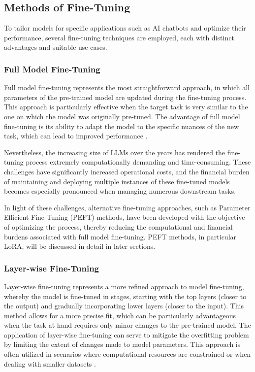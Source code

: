 \subsection{Methods of Fine-Tuning}

To tailor models for specific applications such as AI chatbots and optimize their performance, several fine-tuning techniques are employed, each with distinct advantages and suitable use cases.

\subsubsection{Full Model Fine-Tuning}

Full model fine-tuning represents the most straightforward approach, in which all parameters of the pre-trained model are updated during the fine-tuning process. This approach is particularly effective when the target task is very similar to the one on which the model was originally pre-tuned. The advantage of full model fine-tuning is its ability to adapt the model to the specific nuances of the new task, which can lead to improved performance \cite{howard2018universal}.

Nevertheless, the increasing size of LLMs over the years has rendered the fine-tuning process extremely computationally demanding and time-consuming. These challenges have significantly increased operational costs, and the financial burden of maintaining and deploying multiple instances of these fine-tuned models becomes especially pronounced when managing numerous downstream tasks.

In light of these challenges, alternative fine-tuning approaches, such as Parameter Efficient Fine-Tuning (PEFT) methods, have been developed with the objective of optimizing the process, thereby reducing the computational and financial burdens associated with full model fine-tuning. PEFT methods, in particular LoRA, will be discussed in detail in later sections.

\subsubsection{Layer-wise Fine-Tuning}

Layer-wise fine-tuning represents a more refined approach to model fine-tuning, whereby the model is fine-tuned in stages, starting with the top layers (closer to the output) and gradually incorporating lower layers (closer to the input). This method allows for a more precise fit, which can be particularly advantageous when the task at hand requires only minor changes to the pre-trained model. The application of layer-wise fine-tuning can serve to mitigate the overfitting problem by limiting the extent of changes made to model parameters. This approach is often utilized in scenarios where computational resources are constrained or when dealing with smaller datasets \cite{ro2021autolr}.

